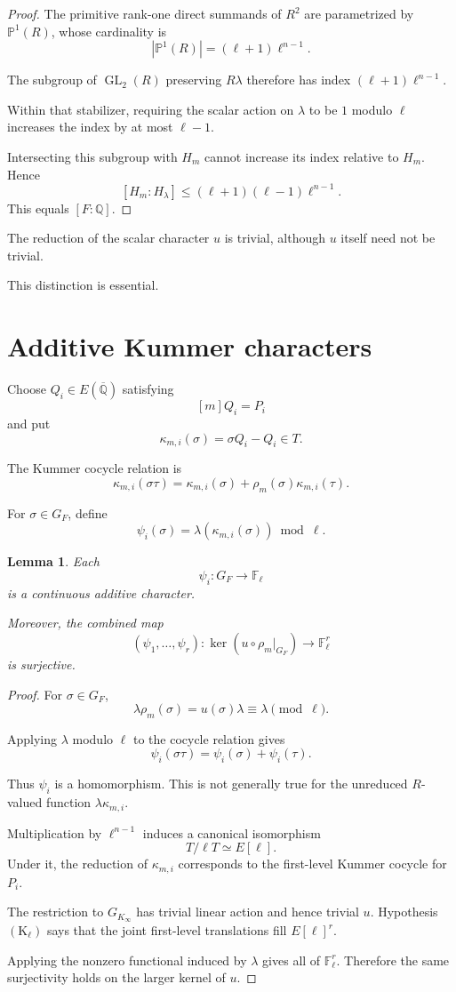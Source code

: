 \documentclass[11pt]{article}
\newtheorem{lemma}[theorem]{Lemma}
\begin{document}
\begin{proof}
The primitive rank-one direct summands of
$R^2$ are parametrized by
$\mathbb P^1(R)$, whose cardinality is
\[
|\mathbb P^1(R)|=(\ell+1)\ell^{n-1}.
\]

The subgroup of $\operatorname{GL}_2(R)$
preserving $R\lambda$ therefore has index
$(\ell+1)\ell^{n-1}$.

Within that stabilizer, requiring the
scalar action on $\lambda$ to be
$1$ modulo $\ell$ increases the index
by at most $\ell-1$.

Intersecting this subgroup with $H_m$
cannot increase its index relative to
$H_m$. Hence
\[
[H_m:H_\lambda]
\le(\ell+1)(\ell-1)\ell^{n-1}.
\]
This equals $[F:\mathbb Q]$.
\end{proof}

The reduction of the scalar character
$u$ is trivial, although $u$ itself
need not be trivial.

This distinction is essential.

\section{Additive Kummer characters}

Choose $Q_i\in E(\overline{\mathbb Q})$
satisfying
\[
[m]Q_i=P_i
\]
and put
\[
\kappa_{m,i}(\sigma)
=\sigma Q_i-Q_i\in T.
\]

The Kummer cocycle relation is
\[
\kappa_{m,i}(\sigma\tau)
=
\kappa_{m,i}(\sigma)
+\rho_m(\sigma)\kappa_{m,i}(\tau).
\]

For $\sigma\in G_F$, define
\[
\psi_i(\sigma)
=
\lambda(\kappa_{m,i}(\sigma))
\bmod\ell.
\]

\begin{lemma}
\label{lem:characters}
Each
\[
\psi_i:G_F\longrightarrow\mathbb F_\ell
\]
is a continuous additive character.

Moreover, the combined map
\[
(\psi_1,\ldots,\psi_r):
\ker(u\circ\rho_m|_{G_F})
\longrightarrow\mathbb F_\ell^r
\]
is surjective.
\end{lemma}

\begin{proof}
For $\sigma\in G_F$,
\[
\lambda\rho_m(\sigma)
=u(\sigma)\lambda
\equiv\lambda\pmod\ell.
\]

Applying $\lambda$ modulo $\ell$ to
the cocycle relation gives
\[
\psi_i(\sigma\tau)
=\psi_i(\sigma)+\psi_i(\tau).
\]

Thus $\psi_i$ is a homomorphism.
This is not generally true for the
unreduced $R$-valued function
$\lambda\kappa_{m,i}$.

Multiplication by $\ell^{n-1}$ induces
a canonical isomorphism
\[
T/\ell T\simeq E[\ell].
\]
Under it, the reduction of
$\kappa_{m,i}$ corresponds to the
first-level Kummer cocycle for $P_i$.

The restriction to
$G_{K_\infty}$ has trivial linear
action and hence trivial $u$.
Hypothesis $(\mathrm K_\ell)$ says that
the joint first-level translations
fill $E[\ell]^r$.

Applying the nonzero functional induced
by $\lambda$ gives all of
$\mathbb F_\ell^r$. Therefore the same
surjectivity holds on the larger
kernel of $u$.
\end{proof}
\end{document}

